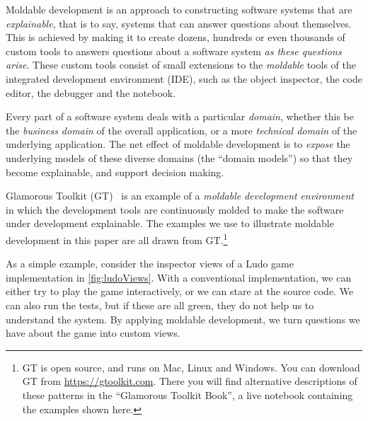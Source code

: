 \documentclass[acmsmall,screen,authorversion,nonacm]{acmart} %
\newcommand\cp[1]{\nbe{Cesare}{#1}{olive}} %
\newcommand\ws[1]{\nbe{Workshop}{#1}{teal}} %
\begin{document}
Moldable development is an approach to constructing software systems that are \emph{explainable}, that is to say, systems that can answer questions about themselves.
This is achieved by making it  to create dozens, hundreds or even thousands of custom tools to answers questions about a software system \emph{as these questions arise}.
These custom tools consist of small extensions to the \emph{moldable} tools of the integrated development environment (IDE), such as the object inspector, the code editor, the debugger and the notebook.

Every part of a software system deals with a particular \emph{domain}, whether this be the \emph{business domain} of the overall application, or a more \emph{technical domain}  of the underlying application.
The net effect of moldable development is to \emph{expose} the underlying models of these diverse domains (\ie the ``domain models'') 
so that they become explainable, and support decision making.

Glamorous Toolkit (GT)~\cite{feenk23a} is an example of a \emph{moldable} \emph{development} \emph{environment} in which the development tools are continuously molded to make the software under development explainable.
The examples we use to illustrate moldable development in this paper are all drawn from GT.\footnote{GT is open source, and runs on Mac, Linux and Windows. You can download GT from \url{https://gtoolkit.com}.
There you will find alternative descriptions of these patterns in the ``Glamorous Toolkit Book'', a live notebook containing the examples shown here.}

As a simple example, consider the inspector views of a Ludo game implementation in \autoref{fig:ludoViews}.
With a conventional implementation, we can either try to play the game interactively, or we can stare at the source code.
We can also run the tests, but if these are all green, they do not help us to understand the system.
By applying moldable development, we turn questions we have about the game into custom views.
\end{document}
